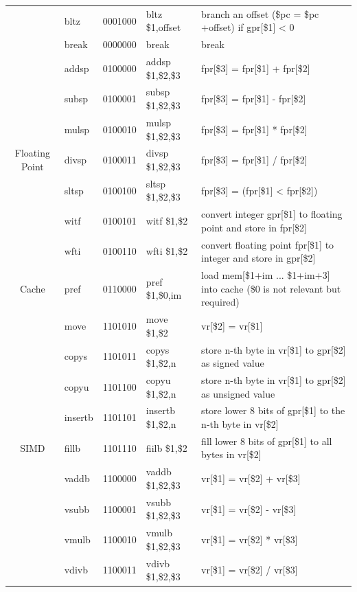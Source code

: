 \documentclass{sig-alternate}
\begin{document}
\begin{table}
\begin{tabular}{|c|l|c|l|l|}
 & bltz & 0001000 & bltz \$1,offset & branch an offset (\$pc = \$pc +offset) if gpr[\$1] < 0 \\ \cline{2-5}
 & break & 0000000 & break & break \\ \hline
 \multirow{7}{*}{Floating Point} & addsp & 0100000 & addsp \$1,\$2,\$3 & fpr[\$3] = fpr[\$1] + fpr[\$2] \\ \cline{2-5}
 & subsp & 0100001 & subsp \$1,\$2,\$3 & fpr[\$3] = fpr[\$1] - fpr[\$2] \\ \cline{2-5}  
 & mulsp & 0100010 & mulsp \$1,\$2,\$3 & fpr[\$3] = fpr[\$1] * fpr[\$2] \\ \cline{2-5}
 & divsp & 0100011 & divsp \$1,\$2,\$3 & fpr[\$3] = fpr[\$1] / fpr[\$2] \\ \cline{2-5}
 & sltsp & 0100100 & sltsp \$1,\$2,\$3 & fpr[\$3] = (fpr[\$1] < fpr[\$2])\\ \cline{2-5}
 & witf & 0100101 & witf \$1,\$2 & convert integer gpr[\$1] to floating point and store in fpr[\$2] \\ \cline{2-5}
 & wfti & 0100110 & wfti \$1,\$2 & convert floating point fpr[\$1] to integer and store in gpr[\$2]\\ \hline
 Cache & pref & 0110000 & pref \$1,\$0,im & load mem[\$1+im ... \$1+im+3] into cache (\$0 is not relevant but required) \\ \hline
 \multirow{15}{*}{SIMD} & move & 1101010 & move \$1,\$2 & vr[\$2] = vr[\$1] \\ \cline{2-5}
 & copys & 1101011 & copys \$1,\$2,n & store n-th byte in vr[\$1] to gpr[\$2] as signed value \\ \cline{2-5}  
 & copyu & 1101100 & copyu \$1,\$2,n & store n-th byte in vr[\$1] to gpr[\$2] as unsigned value\\ \cline{2-5}
 & insertb & 1101101 & insertb \$1,\$2,n & store lower 8 bits of gpr[\$1] to the n-th byte in vr[\$2] \\ \cline{2-5}
 & fillb & 1101110 & fiilb \$1,\$2 & fill lower 8 bits of gpr[\$1] to all bytes in vr[\$2] \\ \cline{2-5}
 & vaddb & 1100000 & vaddb \$1,\$2,\$3 & vr[\$1] = vr[\$2] + vr[\$3] \\ \cline{2-5}
 & vsubb & 1100001 & vsubb \$1,\$2,\$3 & vr[\$1] = vr[\$2] - vr[\$3]  \\ \cline{2-5}  
 & vmulb & 1100010 & vmulb \$1,\$2,\$3 & vr[\$1] = vr[\$2] * vr[\$3]  \\ \cline{2-5}
 & vdivb & 1100011 & vdivb \$1,\$2,\$3 & vr[\$1] = vr[\$2] / vr[\$3]  \\ \cline{2-5}

\end{tabular}
\end{table}
\end{document}
